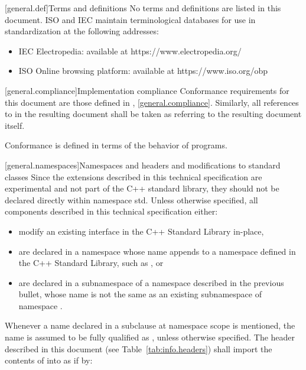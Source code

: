 [general.def]{Terms and definitions}
\pnum
{}%
No terms and definitions are listed in this document. ISO and IEC maintain
terminological databases for use in standardization at the following addresses:

\begin{itemize}
    \item IEC Electropedia: available at https://www.electropedia.org/
    \item ISO Online browsing platform: available at https://www.iso.org/obp
\end{itemize}

[general.compliance]{Implementation compliance}
\pnum
Conformance requirements for this document are those defined in {\cppstddocno}, \ref{general.compliance}. Similarly, all references to {\cppstddocno} in the resulting document shall be taken as referring to the resulting document itself.
\begin{note}
Conformance is defined in terms of the behavior of programs.
\end{note}


[general.namespaces]{Namespaces and headers and modifications to standard classes}
\pnum
Since the extensions described in this technical specification are experimental and not part of the C++ standard library, they should not be declared directly within namespace std. Unless otherwise specified, all components described in this technical specification either:

\begin{itemize}
    \item modify an existing interface in the C++ Standard Library in-place,
    \item are declared in a namespace whose name appends  to a namespace defined in the C++ Standard Library, such as , or
    \item are declared in a subnamespace of a namespace described in the previous bullet, whose name is not the same as an existing subnamespace of namespace .
\end{itemize}

\pnum
Whenever a name  declared in a subclause at namespace scope
is mentioned, the name  is assumed to be fully qualified as
, unless otherwise specified.
The header described in this document (see Table~\ref{tab:info.headers})
shall import the contents of  into
 as if by:

